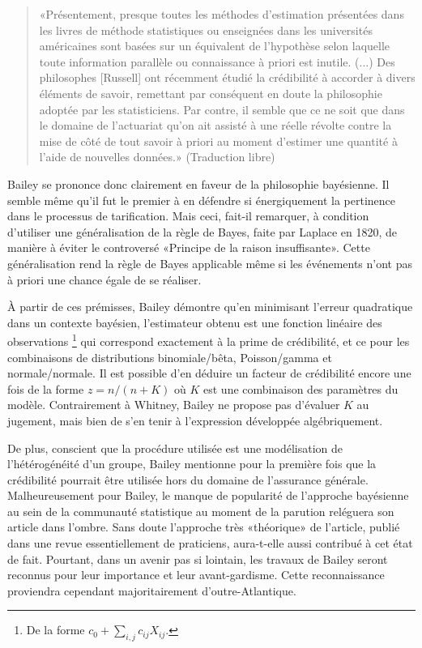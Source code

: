\begin{quote}
  «Présentement, presque toutes les méthodes d'estimation présentées
  dans les livres de méthode statistiques ou enseignées dans les
  universités américaines sont basées sur un équivalent de l'hypothèse
  selon laquelle toute information parallèle ou connaissance à priori
  est inutile. (...) Des philosophes [Russell] ont récemment étudié la
  crédibilité à accorder à divers éléments de savoir, remettant par
  conséquent en doute la philosophie adoptée par les statisticiens.
  Par contre, il semble que ce ne soit que dans le domaine de
  l'actuariat qu'on ait assisté à une réelle révolte contre la mise de
  côté de tout savoir à priori au moment d'estimer une quantité à
  l'aide de nouvelles données.» (Traduction libre)
\end{quote}

Bailey se prononce donc clairement en faveur de la philosophie
bayésienne. Il semble même qu'il fut le premier à en défendre si
énergiquement la pertinence dans le processus de tarification. Mais
ceci, fait-il remarquer, à condition d'utiliser une généralisation de
la règle de Bayes, faite par Laplace en 1820, de manière à éviter le
controversé «Principe de la raison insuffisante». Cette généralisation
rend la règle de Bayes applicable même si les événements n'ont pas à
priori une chance égale de se réaliser.

À partir de ces prémisses, Bailey démontre qu'en minimisant l'erreur
quadratique dans un contexte bayésien, l'estimateur obtenu est une
fonction linéaire des observations%
\footnote{De la forme $c_0 + \sum_{i,j} c_{ij} X_{ij}$.} %
qui correspond exactement à la prime de crédibilité, et ce pour les
combinaisons de distributions binomiale/bêta, Poisson/gamma et
normale/normale. Il est possible d'en déduire un facteur de
crédibilité encore une fois de la forme $z = n/(n + K)$ où $K$ est une
combinaison des paramètres du modèle.  Contrairement à Whitney, Bailey
ne propose pas d'évaluer $K$ au jugement, mais bien de s'en tenir à
l'expression développée algébriquement.

De plus, conscient que la procédure utilisée est une modélisation de
l'hétérogénéité d'un groupe, Bailey mentionne pour la première fois
que la crédibilité pourrait être utilisée hors du domaine de
l'assurance générale. Malheureusement pour Bailey, le manque de
popularité de l'approche bayésienne au sein de la communauté
statistique au moment de la parution reléguera son article dans
l'ombre. Sans doute l'approche très «théorique» de l'article, publié
dans une revue essentiellement de praticiens, aura-t-elle aussi
contribué à cet état de fait. Pourtant, dans un avenir pas si
lointain, les travaux de Bailey seront reconnus pour leur importance
et leur avant-gardisme. Cette reconnaissance proviendra cependant
majoritairement d'outre-Atlantique.


